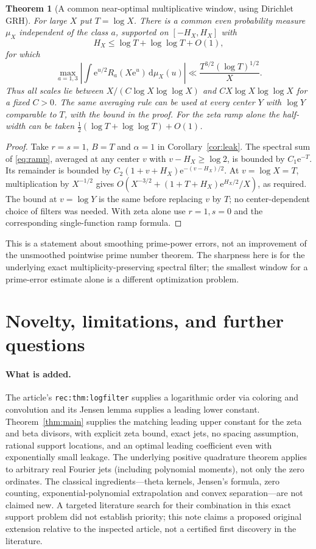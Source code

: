 \documentclass[11pt]{article}
\newtheorem{theorem}{Theorem}[section]
\theoremstyle{remark}\newtheorem{remark}[theorem]{Remark}
\newcommand{\e}{\mathrm e}
\newcommand{\dd}{\,\mathrm d}
\begin{document}
\begin{theorem}[A common near-optimal multiplicative window, using Dirichlet GRH]\label{thm:prime}
For large $X$ put $T=\log X$. There is a common even probability measure $\mu_X$ independent of the class $a$, supported on $[-H_X,H_X]$ with
\[
 H_X\le\log T+\log\log T+O(1),
\]
for which
\[
 \max_{a=1,3}\left|\int \e^{u/2} R_a(X\e^u)\dd\mu_X(u)\right|
 \ll \frac{T^{3/2}(\log T)^{1/2}}{X}.
\]
Thus all scales lie between $X/(C\log X\log\log X)$ and $CX\log X\log\log X$ for a fixed $C>0$. The same averaging rule can be used at every center $Y$ with $\log Y$ comparable to $T$, with the bound in the proof. For the zeta ramp alone the half-width can be taken $\tfrac12(\log T+\log\log T)+O(1)$.
\end{theorem}
\begin{proof}
Take $r=s=1$, $B=T$ and $\alpha=1$ in Corollary~\ref{cor:leak}. The spectral sum of \eqref{eq:ramp}, averaged at any center $v$ with $v-H_X\ge\log2$, is bounded by $C_1\e^{-T}$. Its remainder is bounded by $C_2(1+v+H_X)\e^{-(v-H_X)/2}$. At $v=\log X=T$, multiplication by $X^{-1/2}$ gives $O(X^{-3/2}+(1+T+H_X)\e^{H_X/2}/X)$, as required. The bound at $v=\log Y$ is the same before replacing $v$ by $T$; no center-dependent choice of filters was needed. With zeta alone use $r=1,s=0$ and the corresponding single-function ramp formula.
\end{proof}
This is a statement about smoothing prime-power errors, not an improvement of the unsmoothed pointwise prime number theorem. The sharpness here is for the underlying exact multiplicity-preserving spectral filter; the smallest window for a prime-error estimate alone is a different optimization problem.

\section{Novelty, limitations, and further questions}
\paragraph{What is added.} The article's \texttt{rec:thm:logfilter} supplies a logarithmic order via coloring and convolution and its Jensen lemma supplies a leading lower constant. Theorem~\ref{thm:main} supplies the matching leading upper constant for the zeta and beta divisors, with explicit zeta bound, exact jets, no spacing assumption, rational support locations, and an optimal leading coefficient even with exponentially small leakage. The underlying positive quadrature theorem applies to arbitrary real Fourier jets (including polynomial moments), not only the zero ordinates. The classical ingredients---theta kernels, Jensen's formula, zero counting, exponential-polynomial extrapolation and convex separation---are not claimed new. A targeted literature search for their combination in this exact support problem did not establish priority; this note claims a proposed original extension relative to the inspected article, not a certified first discovery in the literature.
\end{document}
